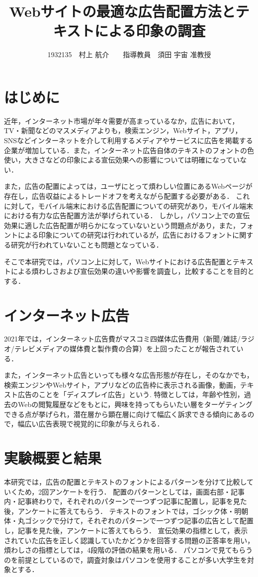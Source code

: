\documentclass[twocolumn,10pt,a4j]{ltjsarticle}
\title{Webサイトの最適な広告配置方法とテキストによる印象の調査}
\author{1932135　村上 航介　　指導教員　須田 宇宙 准教授}
\date{}
\begin{document}
\maketitle

\section{はじめに}
近年，インターネット市場が年々需要が高まっているなか，広告において，TV・新聞などのマスメディアよりも，検索エンジン，Webサイト，アプリ，SNSなどインターネットを介して利用するメディアやサービスに広告を掲載する企業が増加している．また，インターネット広告自体のテキストのフォントの色使い，大きさなどの印象による宣伝効果への影響については明確になっていない．

また，広告の配置によっては，ユーザにとって煩わしい位置にあるWebページが存在し，広告収益によるトレードオフを考えながら配置する必要がある．
これに対して，モバイル端末における広告配置についての研究があり，モバイル端末における有力な広告配置方法が挙げられている\cite{mobile}．
しかし，パソコン上での宣伝効果に適した広告配置が明らかになっていないという問題点があり，また，フォントによる印象についての研究は行われているが，広告におけるフォントに関する研究が行われていないことも問題となっている．

そこで本研究では，パソコン上に対して，Webサイトにおける広告配置とテキストによる煩わしさおよび宣伝効果の違いや影響を調査し，比較することを目的とする．

\section{インターネット広告}
2021年では，インターネット広告費がマスコミ四媒体広告費用（新聞/雑誌/ラジオ/テレビメディアの媒体費と製作費の合算）を上回ったことが報告されている\cite{dentsu}．

また，インターネット広告といっても様々な広告形態が存在し，そのなかでも，検索エンジンやWebサイト，アプリなどの広告枠に表示される画像，動画，テキスト広告のことを「ディスプレイ広告」という.
特徴としては，年齢や性別，過去のWebの閲覧履歴などをもとに，興味を持ってもらいたい層をターゲティングできる点が挙げられ，潜在層から顕在層に向けて幅広く訴求できる傾向にあるので，幅広い広告表現で視覚的に印象が与えられる．

\section{実験概要と結果}
本研究では，広告の配置とテキストのフォントによるパターンを分けて比較していくため，2回アンケートを行う．
配置のパターンとしては，画面右部・記事内・記事終わりで，それぞれのパターンで一つずつ記事に配置し，記事を見た後，アンケートに答えてもらう．
テキストのフォントでは，ゴシック体・明朝体・丸ゴシックで分けて，それぞれのパターンで一つずつ記事の広告として配置し，記事を見た後，アンケートに答えてもらう．
宣伝効果の指標として，表示されていた広告を正しく認識していたかどうかを回答する問題の正答率を用い，煩わしさの指標としては，4段階の評価の結果を用いる．
パソコンで見てもらうのを前提としているので，調査対象はパソコンを使用することが多い大学生を対象とする．
\end{document}
